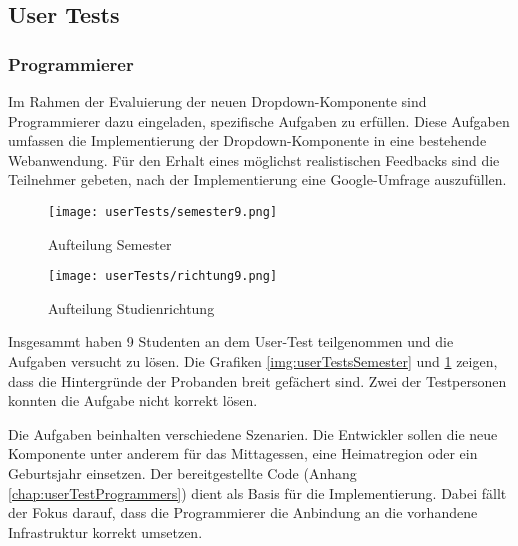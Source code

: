 \subsection{User Tests} %
\label{sec:userTests}



\subsubsection{Programmierer}
\label{sec:userTestsProgrammer}

Im Rahmen der Evaluierung der neuen Dropdown-Komponente sind Programmierer dazu eingeladen, spezifische Aufgaben zu erfüllen. 
Diese Aufgaben umfassen die Implementierung der Dropdown-Komponente in eine bestehende Webanwendung. 
Für den Erhalt eines möglichst realistischen Feedbacks sind die Teilnehmer gebeten, nach der Implementierung eine Google-Umfrage auszufüllen. 

\begin{figure}[!htb]
    \centering
    \begin{minipage}[b]{0.45\textwidth}
        \centering
        \texttt{[image: userTests/semester9.png]}
        \caption{\centering Aufteilung Semester}
        \label{img:userTestsSemester}
    \end{minipage}
    \hfill
    \begin{minipage}[b]{0.45\textwidth}
        \centering
        \texttt{[image: userTests/richtung9.png]}
        \caption{\centering Aufteilung Studienrichtung}
        \label{img:userTestsStudy}
    \end{minipage}
\end{figure}

Insgesammt haben 9 Studenten an dem User-Test teilgenommen und die Aufgaben versucht zu lösen. 
Die Grafiken \ref{img:userTestsSemester} und \ref{img:userTestsStudy} zeigen, dass die Hintergründe der Probanden breit gefächert sind. 
Zwei der Testpersonen konnten die Aufgabe nicht korrekt lösen. 

Die Aufgaben beinhalten verschiedene Szenarien. 
Die Entwickler sollen die neue Komponente unter anderem für das Mittagessen, eine Heimatregion oder ein Geburtsjahr einsetzen. 
Der bereitgestellte Code (Anhang \ref{chap:userTestProgrammers}) dient als Basis für die Implementierung. 
Dabei fällt der Fokus darauf, dass die Programmierer die Anbindung an die vorhandene Infrastruktur korrekt umsetzen. 


